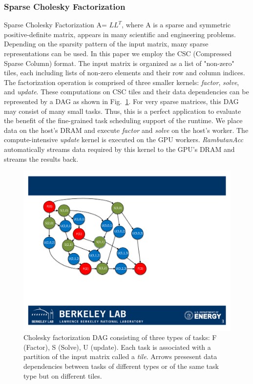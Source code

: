 \subsubsection{Sparse Cholesky Factorization}
Sparse Cholesky Factorization A= $LL^T$, where A is a sparse and symmetric positive-definite matrix,
appears in many scientific and engineering problems.
Depending on the sparsity pattern of the input matrix, many sparse representations can be used.
In this paper we employ the CSC (Compressed Sparse Column) format. 
The input matrix is organized as a list of "non-zero" tiles, each including lists of non-zero elements and their row and column indices.
The factorization operation is comprised of three smaller kernels: {\em factor}, {\em solve}, and {\em update}.
These computations on CSC tiles and their data dependencies can be represented by a DAG as shown in Fig.~\ref{fig:cholesky}. 
For very sparse matrices, this DAG may consist of many small tasks.
Thus, this is a perfect application to evaluate the benefit of the fine-grained task scheduling support of the runtime.
We place data on the host's DRAM and execute {\em factor} and {\em solve} on the host's worker.
The compute-intensive {\em update} kernel is executed on the GPU workers.
{\em RambutanAcc} automatically streams data required by this kernel to the GPU's DRAM and streams the results back.

\begin{figure}[htb]
\centering
\includegraphics[width=.3\textwidth]{figures/cholesky.pdf}
\caption{Cholesky factorization DAG consisting of three types of tasks: F (Factor), S (Solve), U (update). Each task is associated with a partition of the input matrix called a {\em tile}. Arrows presesent data dependencies between tasks of different types or of the same task type but on different tiles.}
\label{fig:cholesky}
\end{figure}


